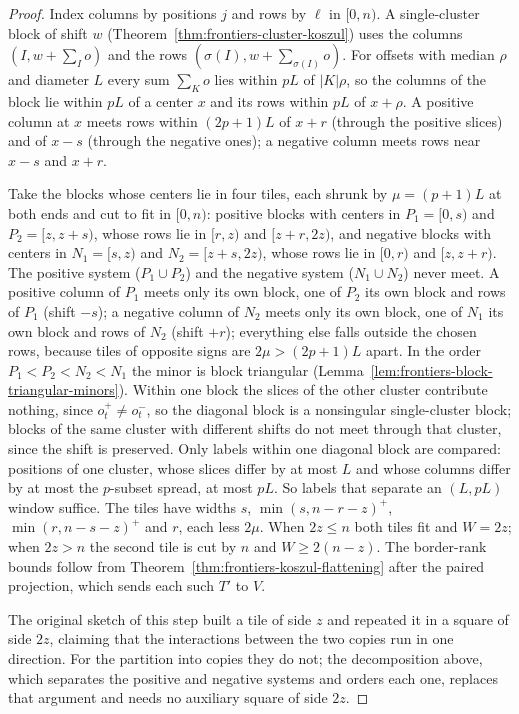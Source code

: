 \begin{proof}
  \leanok
  Index columns by positions $j$ and rows by $\ell$ in $[0, n)$. A single-cluster block of
  shift $w$ (Theorem~\ref{thm:frontiers-cluster-koszul}) uses the columns
  $(I, w + \sum_I o)$ and the rows $(\sigma(I), w + \sum_{\sigma(I)} o)$. For offsets with
  median $\rho$ and diameter $L$ every sum $\sum_K o$ lies within $pL$ of $|K| \rho$, so the
  columns of the block lie within $pL$ of a center $x$ and its rows within $pL$ of
  $x + \rho$. A positive column at $x$ meets rows within $(2p + 1)L$ of $x + r$ (through the
  positive slices) and of $x - s$ (through the negative ones); a negative column meets rows
  near $x - s$ and $x + r$.

  Take the blocks whose centers lie in four tiles, each shrunk by $\mu = (p + 1)L$ at both
  ends and cut to fit in $[0, n)$: positive blocks with centers in $P_1 = [0, s)$ and
  $P_2 = [z, z + s)$, whose rows lie in $[r, z)$ and $[z + r, 2z)$, and negative blocks with
  centers in $N_1 = [s, z)$ and $N_2 = [z + s, 2z)$, whose rows lie in $[0, r)$ and
  $[z, z + r)$. The positive system ($P_1 \cup P_2$) and the negative system
  ($N_1 \cup N_2$) never meet. A positive column of $P_1$ meets only its own block, one of
  $P_2$ its own block and rows of $P_1$ (shift $-s$); a negative column of $N_2$ meets only
  its own block, one of $N_1$ its own block and rows of $N_2$ (shift $+r$); everything else
  falls outside the chosen rows, because tiles of opposite signs are $2\mu > (2p + 1)L$
  apart. In the order $P_1 < P_2 < N_2 < N_1$ the minor is block triangular
  (Lemma~\ref{lem:frontiers-block-triangular-minors}). Within one block the slices of the
  other cluster contribute nothing, since $o^+_t \ne o^-_t$, so the diagonal block is a
  nonsingular single-cluster block; blocks of the same cluster with different shifts do
  not meet through that cluster, since the shift is preserved. Only labels within one
  diagonal block are compared: positions of one cluster, whose slices differ by at most $L$
  and whose columns differ by at most the $p$-subset spread, at most $pL$. So labels that
  separate an $(L, pL)$ window suffice. The tiles have widths $s$,
  $\min(s, n - r - z)^+$, $\min(r, n - s - z)^+$ and $r$, each less $2\mu$. When
  $2z \le n$ both tiles fit and $W = 2z$; when $2z > n$ the second tile is cut by $n$ and
  $W \ge 2(n - z)$. The border-rank bounds follow from
  Theorem~\ref{thm:frontiers-koszul-flattening} after the paired projection, which sends
  each such $T'$ to $V$.

  The original sketch of this step built a tile of side $z$ and repeated it in a square of
  side $2z$, claiming that the interactions between the two copies run in one direction.
  For the partition into copies they do not; the decomposition above, which separates the
  positive and negative systems and orders each one, replaces that argument and needs no
  auxiliary square of side $2z$.
\end{proof}

